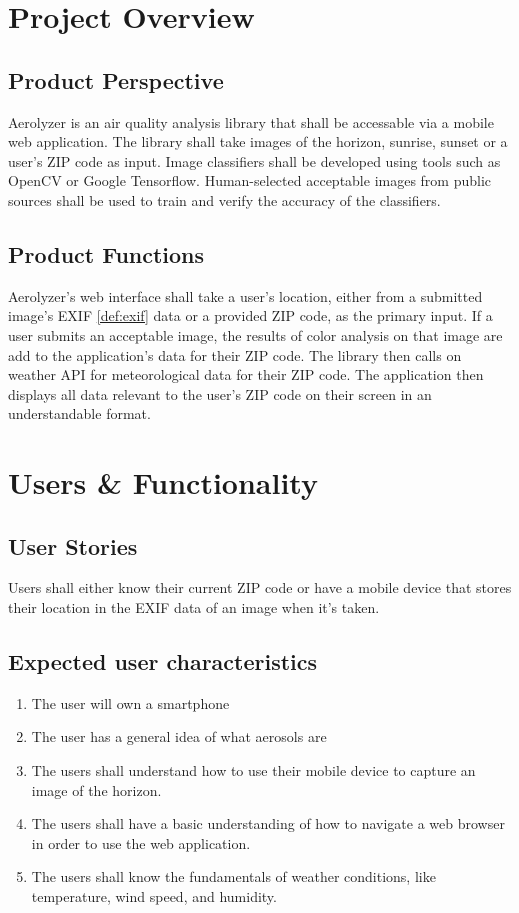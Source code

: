 \documentclass[journal,10pt,draftclsnofoot,onecolumn]{IEEEtran}
\begin{document}
\begin{singlespace}
\section{Project Overview}

	\subsection{Product Perspective}
		Aerolyzer is an air quality analysis library that shall be accessable via a mobile web application.
		The library shall take images of the horizon, sunrise, sunset or a user's ZIP code as input.
		Image classifiers shall be developed using tools such as OpenCV or Google Tensorflow.
		Human-selected acceptable images from public sources shall be used to train and verify the accuracy of the classifiers.

	\subsection{Product Functions}
		Aerolyzer's web interface shall take a user's location, either from a submitted image's EXIF \ref{def:exif} data or a provided ZIP code, as the primary input.
		If a user submits an acceptable image, the results of color analysis on that image are add to the application's data for their ZIP code.
		The library then calls on weather API for meteorological data for their ZIP code.
		The application then displays all data relevant to the user's ZIP code on their screen in an understandable format.

\clearpage

\section{Users \& Functionality}
	
	\subsection{User Stories}
		Users shall either know their current ZIP code or have a mobile device that stores their location in the EXIF data of an image when it's taken.

	\subsection{Expected user characteristics}
	\begin{enumerate}
		\item The user will own a smartphone
		\item The user has a general idea of what aerosols are
		\item The users shall understand how to use their mobile device to capture an image of the horizon.
		\item The users shall have a basic understanding of how to navigate a web browser in order to use the web application.
		\item The users shall know the fundamentals of weather conditions, like temperature, wind speed, and humidity.
	\end{enumerate}


\end{singlespace}
\end{document}
